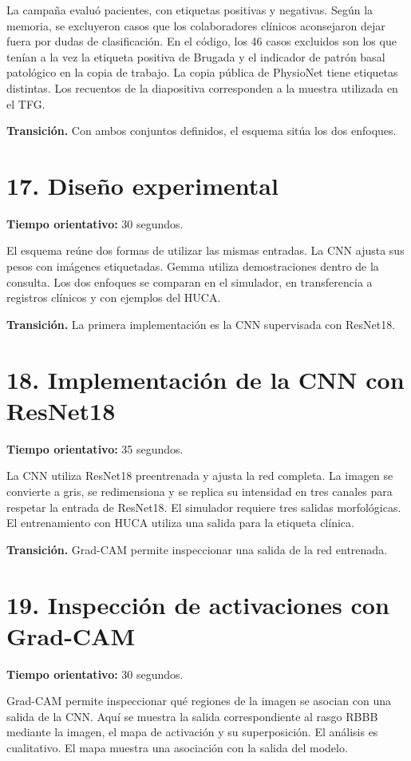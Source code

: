 \documentclass[11pt,a4paper]{article}
\begin{document}
La campaña evaluó \HucaPatients{} pacientes, con \HucaPositive{} etiquetas positivas y \HucaNegative{} negativas. Según la memoria, se excluyeron casos que los colaboradores clínicos aconsejaron dejar fuera por dudas de clasificación. En el código, los 46 casos excluidos son los que tenían a la vez la etiqueta positiva de Brugada y el indicador de patrón basal patológico en la copia de trabajo. La copia pública de PhysioNet tiene etiquetas distintas. Los recuentos de la diapositiva corresponden a la muestra utilizada en el TFG.

\textbf{Transición.} Con ambos conjuntos definidos, el esquema sitúa los dos enfoques.

\section*{17. Diseño experimental}
\textbf{Tiempo orientativo: }30 segundos.

El esquema reúne dos formas de utilizar las mismas entradas. La CNN ajusta sus pesos con imágenes etiquetadas. Gemma utiliza demostraciones dentro de la consulta. Los dos enfoques se comparan en el simulador, en transferencia a registros clínicos y con ejemplos del HUCA.

\textbf{Transición.} La primera implementación es la CNN supervisada con ResNet18.

\section*{18. Implementación de la CNN con ResNet18}
\textbf{Tiempo orientativo: }35 segundos.

La CNN utiliza ResNet18 preentrenada y ajusta la red completa. La imagen se convierte a gris, se redimensiona y se replica su intensidad en tres canales para respetar la entrada de ResNet18. El simulador requiere tres salidas morfológicas. El entrenamiento con HUCA utiliza una salida para la etiqueta clínica.

\textbf{Transición.} Grad-CAM permite inspeccionar una salida de la red entrenada.

\section*{19. Inspección de activaciones con Grad-CAM}
\textbf{Tiempo orientativo: }30 segundos.

Grad-CAM permite inspeccionar qué regiones de la imagen se asocian con una salida de la CNN. Aquí se muestra la salida correspondiente al rasgo RBBB mediante la imagen, el mapa de activación y su superposición. El análisis es cualitativo. El mapa muestra una asociación con la salida del modelo.
\end{document}
